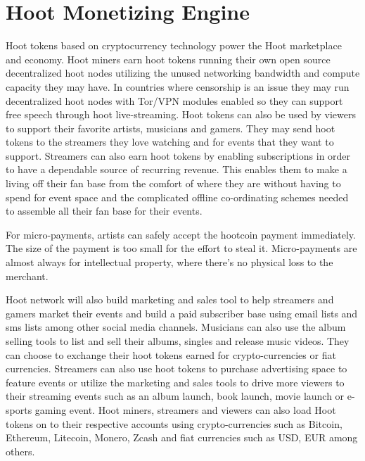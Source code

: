 \documentclass{article}
\begin{document}
\section{Hoot Monetizing Engine}
Hoot tokens based on cryptocurrency technology power the Hoot
marketplace and economy. Hoot miners earn hoot tokens running their own open source
decentralized hoot nodes utilizing the unused networking bandwidth
and compute capacity they may have. In countries where censorship is an issue they
may run decentralized hoot nodes with Tor/VPN modules enabled so they can
support free speech through hoot
live-streaming. Hoot tokens can also be used by viewers to support their favorite artists,
musicians and gamers. They may send hoot tokens to the
streamers they love watching and for events that they want to
support. Streamers can also earn hoot tokens by enabling subscriptions in order to have a
dependable source of recurring revenue. This enables them to make a
living off their fan base from the comfort of where they are without
having to spend for event space and the complicated offline
co-ordinating schemes needed to assemble all their fan base for their events.

For micro-payments, artists can safely accept the hootcoin payment immediately.  The size of the payment is too small for the effort to steal it. Micro-payments are almost always for intellectual property, where there's no physical loss to the merchant. 

 Hoot network will also build marketing and sales tool to help streamers and gamers market their 
events and build a paid subscriber base using email lists and sms lists among other social media channels. 
Musicians can also use the album selling tools to list and sell
their albums, singles and release music videos. They can choose to exchange their hoot tokens earned for crypto-currencies or fiat currencies.
 Streamers can also use hoot tokens to
purchase advertising space to feature events or utilize the marketing and sales
tools to drive more viewers to their
streaming events such as an album launch, book launch, movie launch or
e-sports gaming event. Hoot miners, streamers and viewers can also load Hoot
tokens on to their respective accounts using crypto-currencies such as Bitcoin,
Ethereum, Litecoin, Monero, Zcash and fiat currencies such as USD, EUR among others.
\end{document}
